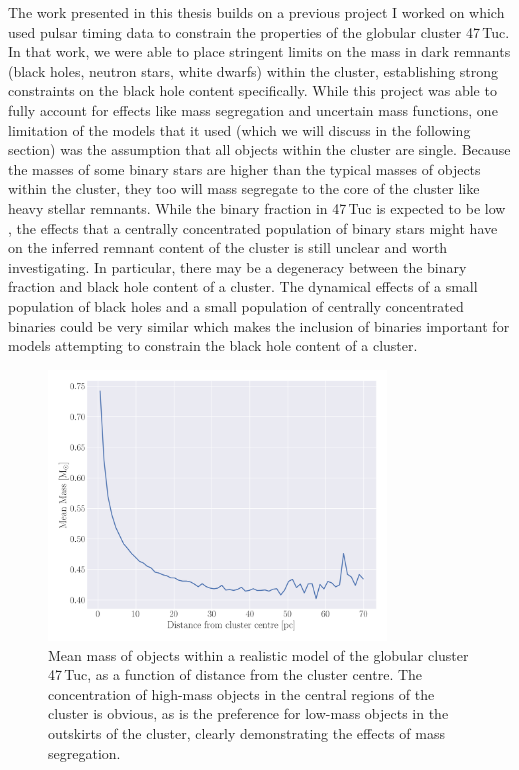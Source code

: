 The work presented in this thesis builds on a previous project I worked on which used pulsar timing
data to constrain the properties of the globular cluster 47\,Tuc. In that work, we were able to
place stringent limits on the mass in dark remnants (black holes, neutron stars, white dwarfs)
within the cluster, establishing strong constraints on the black hole content specifically. While
this project was able to fully account for effects like mass segregation and uncertain mass
functions, one limitation of the models that it used (which we will discuss in the following
section) was the assumption that all objects within the cluster are single. Because the masses of
some binary stars are higher than the typical masses of objects within the cluster, they too will
mass segregate to the core of the cluster like heavy stellar remnants. While the binary fraction in
47\,Tuc is expected to be low \citep{Milone2012}, the effects that a centrally concentrated
population of binary stars might have on the inferred remnant content of the cluster is still
unclear and worth investigating. In particular, there may be a degeneracy between the binary
fraction and black hole content of a cluster. The dynamical effects of a small population of black
holes and a small population of centrally concentrated binaries could be very similar which makes
the inclusion of binaries important for models attempting to constrain the black hole content of a
cluster.



\begin{figure}
	\centering
	\includegraphics[width=0.8\textwidth]{figures/radial_mean_mass.png}
	\caption{Mean mass of objects within a realistic model of the globular cluster 47\,Tuc, as a
		function of distance from the cluster centre. The concentration of high-mass objects
		in the central regions of the cluster is obvious, as is the preference for low-mass
		objects in the outskirts of the cluster, clearly demonstrating the effects of mass
		segregation.}
	\label{fig:1/radial_mean_mass}
\end{figure}




